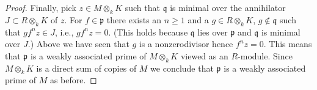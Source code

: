 \begin{proof}
\medskip\noindent
Finally, pick $z \in M \otimes_k K$ such that $\mathfrak q$
is minimal over the annihilator $J \subset R \otimes_k K$ of $z$.
For $f \in \mathfrak p$ there exists an $n \geq 1$ and a
$g \in R \otimes_k K$, $g \not \in \mathfrak q$ such that
$g f^n z \in J$, i.e., $g f^n z = 0$.
(This holds because $\mathfrak q$ lies over $\mathfrak p$
and $\mathfrak q$ is minimal over $J$.)
Above we have seen that $g$ is a nonzerodivisor hence $f^n z = 0$.
This means that $\mathfrak p$ is a weakly associated prime
of $M \otimes_k K$ viewed as an $R$-module.
Since $M \otimes_k K$ is a direct sum of copies of $M$
we conclude that $\mathfrak p$ is a weakly associated
prime of $M$ as before.
\end{proof}





